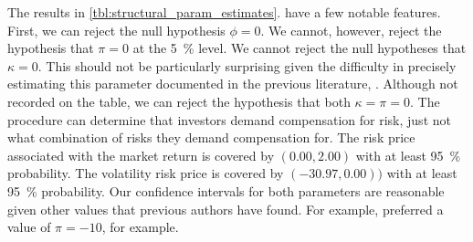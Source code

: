 The results in \cref{tbl:structural_param_estimates}.
have a few notable features. 
First, we can reject the null hypothesis $\phi = 0$. We cannot, however, reject the hypothesis that $\pi = 0$ at the \SI{5}{\percent} level. 
%  
%
%
We cannot reject the null hypotheses that $\kappa = 0$. This should not be particularly surprising given the difficulty in precisely estimating this parameter documented in the previous literature, \parencites{lettau2010measuring}. Although not recorded on the table, we can reject the hypothesis that both $\kappa = \pi = 0$. The procedure can determine that investors demand compensation for risk, just not what combination of risks they demand compensation for.  
%
%
The risk price associated with the market return is covered by $(0.00, 2.00)$ with at least \SI{95}{\percent} probability. The volatility risk price is covered by $(-30.97, 0.00))$ with at least \SI{95}{\percent} probability. Our confidence intervals for both parameters are reasonable given other values that previous authors have found. For example, \Textcite{han2018leverage} preferred a value of $\pi = -10$, for example. 


